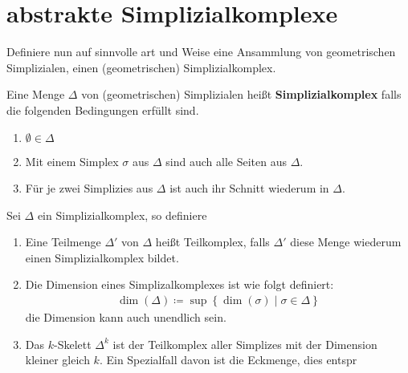 
\section{abstrakte Simplizialkomplexe}

Definiere nun auf sinnvolle art und Weise eine Ansammlung von
geometrischen Simplizialen, einen (geometrischen) Simplizialkomplex.

\begin{Def}
	Eine Menge $\Delta$ von (geometrischen) Simplizialen heißt
	\textbf{Simplizialkomplex} falls die folgenden Bedingungen erfüllt
	sind.
	\begin{enumerate}[1)]
		\item $\emptyset \in \Delta$
		\item Mit einem Simplex $\sigma$ aus $\Delta$ sind auch alle Seiten
		aus $\Delta$.
		\item Für je zwei Simplizies aus $\Delta$ ist auch ihr Schnitt
		wiederum in $\Delta$.
	\end{enumerate}
\end{Def}


\begin{Def}
	Sei $\Delta$ ein Simplizialkomplex, so definiere
	\begin{enumerate}[1)]
		\item Eine Teilmenge $\Delta'$ von $\Delta$ heißt Teilkomplex, falls
		$\Delta'$ diese Menge wiederum einen Simplizialkomplex bildet.
		\item Die Dimension eines Simplizalkomplexes ist wie folgt
		definiert:
		\begin{gather*}
		\dim(\Delta) \coloneqq \sup \left\{ \dim(\sigma) \; \Big| \;
		\sigma \in \Delta \right\}
		\end{gather*}
		die Dimension kann auch unendlich sein.
		\item Das $k$-Skelett $\Delta^k$ ist der Teilkomplex aller Simplizes
		mit der Dimension kleiner gleich $k$.  Ein Spezialfall davon ist
		die Eckmenge, dies entspr
	\end{enumerate}
\end{Def}



